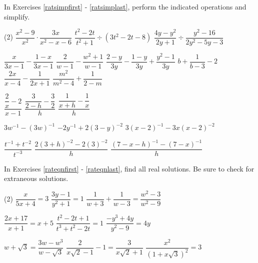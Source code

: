 \label{ExercisesforAppRatExpEqus}

In Exercises \ref{ratsimpfirst} - \ref{ratsimplast}, perform the indicated operations and simplify.

\begin{tasks}(2)
\task $\dfrac{x^2-9}{x^2} \cdot \dfrac{3x}{x^2-x-6}$\label{ratsimpfirst}
\task $\dfrac{t^2-2t}{t^2+1} \div (3t^2 - 2t - 8)$
\task $\dfrac{4y-y^2}{2y+1} \div \dfrac{y^2-16}{2y^2-5y-3}$

\task  $\dfrac{x}{3x-1} - \dfrac{1-x}{3x-1}$
\task  $\dfrac{2}{w-1} - \dfrac{w^2+1}{w-1}$
\task  $\dfrac{2-y}{3y} - \dfrac{1-y}{3y} + \dfrac{y^2-1}{3y}$
\task  $b+ \dfrac{1}{b-3} - 2$
\task  $\dfrac{2x}{x-4} - \dfrac{1}{2x+1}$
\task  $\dfrac{m^2}{m^2-4} + \dfrac{1}{2-m}$

\task $\dfrac{\dfrac{2}{x} - 2}{x-1}$
\task $\dfrac{\dfrac{3}{2-h} - \dfrac{3}{2}}{h}$
\task $\dfrac{\dfrac{1}{x+h} - \dfrac{1}{x}}{h}$


\task  $3w^{-1} - (3w)^{-1}$
\task  $-2y^{-1}  + 2(3-y)^{-2}$
\task  $3(x-2)^{-1} - 3x(x-2)^{-2}$

 
\task $\dfrac{t^{-1} + t^{-2}}{t^{-3}}$  
\task $\dfrac{2(3+h)^{-2} - 2(3)^{-2}}{h}$ 
\task $\dfrac{(7-x-h)^{-1} - (7-x)^{-1}}{h}$  \label{ratsimplast}

\end{tasks}

In Exercises \ref{rateqnfirst} - \ref{rateqnlast}, find all real solutions.  Be sure to check for extraneous solutions.

\begin{tasks}[resume](2)
\task $\dfrac{x}{5x + 4} = 3$ \label{rateqnfirst}
\task $\dfrac{3y - 1}{y^{2} + 1} = 1$
\task $\dfrac{1}{w + 3} + \dfrac{1}{w - 3} = \dfrac{w^{2} - 3}{w^{2} - 9}$


\task $\dfrac{2x + 17}{x + 1} = x + 5$
\task $\dfrac{t^{2} - 2t + 1}{t^{3} + t^{2} - 2t} = 1$
\task $\dfrac{-y^{3} + 4y}{y^{2} - 9} = 4y$  

\task $w + \sqrt{3} = \dfrac{3w - w^3}{w - \sqrt{3}}$
\task $\dfrac{2}{x\sqrt{2} - 1}  - 1 = \dfrac{3}{x \sqrt{2} + 1}$
\task $\dfrac{x^2}{(1 + x\sqrt{3})^2} = 3$ \label{rateqnlast}

\end{tasks}

